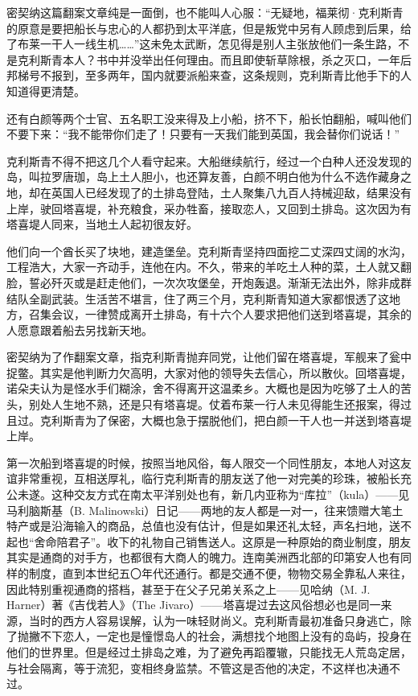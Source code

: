 \par 密契纳这篇翻案文章纯是一面倒，也不能叫人心服：“无疑地，福莱彻·克利斯青的原意是要把船长与忠心的人都扔到太平洋底，但是叛党中另有人顾虑到后果，给了布莱一干人一线生机……”这未免太武断，怎见得是别人主张放他们一条生路，不是克利斯青本人？书中并没举出任何理由。而且即使斩草除根，杀之灭口，一年后邦梯号不报到，至多两年，国内就要派船来查，这条规则，克利斯青比他手下的人知道得更清楚。
\par 还有白颜等两个士官、五名职工没来得及上小船，挤不下，船长怕翻船，喊叫他们不要下来：“我不能带你们走了！只要有一天我们能到英国，我会替你们说话！”
\par 克利斯青不得不把这几个人看守起来。大船继续航行，经过一个白种人还没发现的岛，叫拉罗唐珈，岛上土人胆小，也还算友善，白颜不明白他为什么不选作藏身之地，却在英国人已经发现了的土排岛登陆，土人聚集八九百人持械迎敌，结果没有上岸，驶回塔喜堤，补充粮食，采办牲畜，接取恋人，又回到土排岛。这次因为有塔喜堤人同来，当地土人起初很友好。
\par 他们向一个酋长买了块地，建造堡垒。克利斯青坚持四面挖二丈深四丈阔的水沟，工程浩大，大家一齐动手，连他在内。不久，带来的羊吃土人种的菜，土人就又翻脸，誓必歼灭或是赶走他们，一次次攻堡垒，开炮轰退。渐渐无法出外，除非成群结队全副武装。生活苦不堪言，住了两三个月，克利斯青知道大家都恨透了这地方，召集会议，一律赞成离开土排岛，有十六个人要求把他们送到塔喜堤，其余的人愿意跟着船去另找新天地。
\par 密契纳为了作翻案文章，指克利斯青抛弃同党，让他们留在塔喜堤，军舰来了瓮中捉鳖。其实是他判断力欠高明，大家对他的领导失去信心，所以散伙。回塔喜堤，诺朵夫认为是怪水手们糊涂，舍不得离开这温柔乡。大概也是因为吃够了土人的苦头，别处人生地不熟，还是只有塔喜堤。仗着布莱一行人未见得能生还报案，得过且过。克利斯青为了保密，大概也急于摆脱他们，把白颜一干人也一并送到塔喜堤上岸。
\par 第一次船到塔喜堤的时候，按照当地风俗，每人限交一个同性朋友，本地人对这友谊非常重视，互相送厚礼，临行克利斯青的朋友送了他一对完美的珍珠，被船长充公未遂。这种交友方式在南太平洋别处也有，新几内亚称为“库拉”（kula）——见马利脑斯基（B. Malinowski）日记——两地的友人都是一对一，往来馈赠大笔土特产或是沿海输入的商品，总值也没有估计，但是如果还礼太轻，声名扫地，送不起也“舍命陪君子”。收下的礼物自己销售送人。这原是一种原始的商业制度，朋友其实是通商的对手方，也都很有大商人的魄力。连南美洲西北部的印第安人也有同样的制度，直到本世纪五〇年代还通行。都是交通不便，物物交易全靠私人来往，因此特别重视通商的搭档，甚至于在父子兄弟关系之上——见哈纳（M. J. Harner）著《吉伐若人》（The Jivaro）——塔喜堤过去这风俗想必也是同一来源，当时的西方人容易误解，认为一味轻财尚义。克利斯青最初准备只身逃亡，除了抛撇不下恋人，一定也是憧憬岛人的社会，满想找个地图上没有的岛屿，投身在他们的世界里。但是经过土排岛之难，为了避免再蹈覆辙，只能找无人荒岛定居，与社会隔离，等于流犯，变相终身监禁。不管这是否他的决定，不这样也决通不过。
